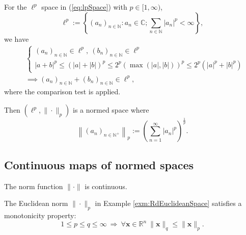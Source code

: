 \begin{exm}
  For the $\ell^{p}$ space in (\ref{eq:lpSpace})
  with $p\in [1,\infty)$,
  \begin{displaymath}
    \ell^p := \left\{
      (a_n)_{n\in \mathbb{N}}: a_n\in \mathbb{C};
      \sum_{n\in \mathbb{N}} |a_n|^p < \infty
    \right\}, 
  \end{displaymath}
  we have
  \begin{align*}
     &\left\{
    \begin{array}{l}
      (a_n)_{n\in \mathbb{N}}\in \ell^p, \  
      (b_n)_{n\in \mathbb{N}}\in \ell^p
    \\
      |a+b|^p \le (|a|+|b|)^p \le 2^p(\max(|a|,|b|))^p
                  \le 2^p(|a|^p+|b|^p)
    \end{array}
    \right.
    \\
    &\implies 
     (a_n)_{n\in \mathbb{N}}+(b_n)_{n\in \mathbb{N}}\in \ell^p,
  \end{align*}
  where the comparison test is applied.

  Then $(\ell^{p}, \|\cdot\|_{p})$
  is a normed space where
  \begin{equation}
    \label{eq:ellPNorm}
    \left\|(a_n)_{n\in \mathbb{N}^+}\right\|_p
    := \left(\sum_{n=1}^{\infty} |a_n|^p\right)^{\frac{1}{p}}.
  \end{equation}
\end{exm}

\subsection{Continuous maps of normed spaces}

\begin{lem}
  \label{lem:normIsContinuousMap}
  The norm function $\|\cdot\|$ is continuous.
\end{lem}

\begin{lem}
  \label{lem:monotonicityOfEuclideanNorm}
  The Euclidean norm $\|\cdot\|_p$
  in Example \ref{exm:RdEuclideanSpace}
  satisfies a monotonicity property:
  \begin{equation}
    \label{eq:monotonicityOfEuclideanNorm}
    1\le p \le q \le \infty
    \ \Rightarrow\
    \forall \mathbf{x}\in \mathbb{R}^n\ 
    \|\mathbf{x}\|_q \le \|\mathbf{x}\|_p.
  \end{equation}
\end{lem}

